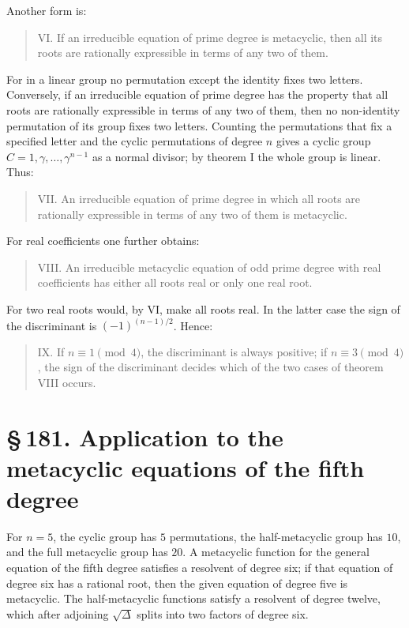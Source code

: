 \documentclass[11pt]{article}
\newcommand{\sect}[2]{\section*{\S\,#1. #2}}
\begin{document}
Another form is:
\begin{quote}
VI. If an irreducible equation of prime degree is metacyclic, then all its roots are rationally expressible in terms of any two of them.
\end{quote}
For in a linear group no permutation except the identity fixes two letters. Conversely, if an irreducible equation of prime degree has the property that all roots are rationally expressible in terms of any two of them, then no non-identity permutation of its group fixes two letters. Counting the permutations that fix a specified letter and the cyclic permutations of degree $n$ gives a cyclic group $C=1,\gamma,\ldots,\gamma^{n-1}$ as a normal divisor; by theorem I the whole group is linear. Thus:
\begin{quote}
VII. An irreducible equation of prime degree in which all roots are rationally expressible in terms of any two of them is metacyclic.
\end{quote}

For real coefficients one further obtains:
\begin{quote}
VIII. An irreducible metacyclic equation of odd prime degree with real coefficients has either all roots real or only one real root.
\end{quote}
For two real roots would, by VI, make all roots real. In the latter case the sign of the discriminant is $(-1)^{(n-1)/2}$. Hence:
\begin{quote}
IX. If $n\equiv1\pmod4$, the discriminant is always positive; if $n\equiv3\pmod4$, the sign of the discriminant decides which of the two cases of theorem VIII occurs.
\end{quote}

\sect{181}{Application to the metacyclic equations of the fifth degree}

For $n=5$, the cyclic group has $5$ permutations, the half-metacyclic group has $10$, and the full metacyclic group has $20$. A metacyclic function for the general equation of the fifth degree satisfies a resolvent of degree six; if that equation of degree six has a rational root, then the given equation of degree five is metacyclic. The half-metacyclic functions satisfy a resolvent of degree twelve, which after adjoining $\sqrt\Delta$ splits into two factors of degree six.
\end{document}
